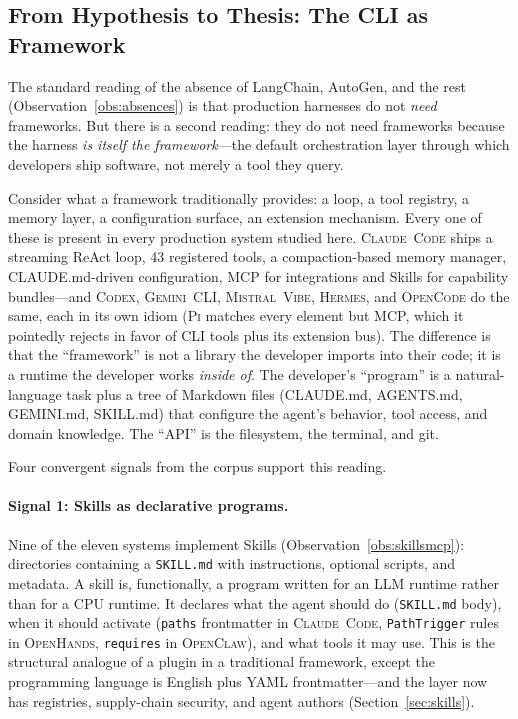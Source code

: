 \documentclass[11pt,a4paper]{article}
\newcommand{\clcode}{\textsc{Claude~Code}\xspace}
\newcommand{\cdx}{\textsc{Codex}\xspace}
\newcommand{\oh}{\textsc{OpenHands}\xspace}
\newcommand{\ocl}{\textsc{OpenClaw}\xspace}
\newcommand{\vibe}{\textsc{Mistral~Vibe}\xspace}
\newcommand{\gemini}{\textsc{Gemini~CLI}\xspace}
\newcommand{\hrm}{\textsc{Hermes}\xspace}
\newcommand{\pib}{\textsc{Pi}\xspace}
\newcommand{\ocd}{\textsc{OpenCode}\xspace}
\begin{document}
\subsection{From Hypothesis to Thesis: The CLI as Framework}
\label{sec:cli_as_framework}

The standard reading of the absence of LangChain, AutoGen, and the rest (Observation~\ref{obs:absences}) is that production harnesses do not \emph{need} frameworks.
But there is a second reading: they do not need frameworks because the harness \emph{is itself the framework}---the default orchestration layer through which developers ship software, not merely a tool they query.

Consider what a framework traditionally provides: a loop, a tool registry, a memory layer, a configuration surface, an extension mechanism.
Every one of these is present in every production system studied here.
\clcode{} ships a streaming ReAct loop, 43 registered tools, a compaction-based memory manager, CLAUDE.md-driven configuration, MCP for integrations and Skills for capability bundles---and \cdx{}, \gemini{}, \vibe{}, \hrm{}, and \ocd{} do the same, each in its own idiom (\pib{} matches every element but MCP, which it pointedly rejects in favor of CLI tools plus its extension bus).
The difference is that the ``framework'' is not a library the developer imports into their code; it is a runtime the developer works \emph{inside of}.
The developer's ``program'' is a natural-language task plus a tree of Markdown files (CLAUDE.md, AGENTS.md, GEMINI.md, SKILL.md) that configure the agent's behavior, tool access, and domain knowledge.
The ``API'' is the filesystem, the terminal, and git.

Four convergent signals from the corpus support this reading.

\paragraph{Signal 1: Skills as declarative programs.}
Nine of the eleven systems implement Skills (Observation~\ref{obs:skillsmcp}): directories containing a \texttt{SKILL.md} with instructions, optional scripts, and metadata.
A skill is, functionally, a program written for an LLM runtime rather than for a CPU runtime.
It declares what the agent should do (\texttt{SKILL.md} body), when it should activate (\texttt{paths} frontmatter in \clcode{}, \texttt{PathTrigger} rules in \oh{}, \texttt{requires} in \ocl{}), and what tools it may use.
This is the structural analogue of a plugin in a traditional framework, except the programming language is English plus YAML frontmatter---and the layer now has registries, supply-chain security, and agent authors (Section~\ref{sec:skills}).
\end{document}
